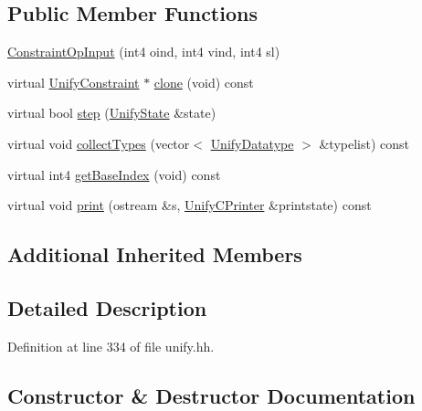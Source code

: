 \subsection*{Public Member Functions}
\begin{DoxyCompactItemize}
\item 
\mbox{\hyperlink{class_constraint_op_input_ab30df7a8432baa0c79c7e909c198ef65}{Constraint\+Op\+Input}} (int4 oind, int4 vind, int4 sl)
\item 
virtual \mbox{\hyperlink{class_unify_constraint}{Unify\+Constraint}} $\ast$ \mbox{\hyperlink{class_constraint_op_input_a59e0a95fa29163053aaf79e29697fd3c}{clone}} (void) const
\item 
virtual bool \mbox{\hyperlink{class_constraint_op_input_ad3db5bd9dd80ffb0492f0ffd11acd19c}{step}} (\mbox{\hyperlink{class_unify_state}{Unify\+State}} \&state)
\item 
virtual void \mbox{\hyperlink{class_constraint_op_input_a0f9b4168eddd0b1933a275bb1f67d7e1}{collect\+Types}} (vector$<$ \mbox{\hyperlink{class_unify_datatype}{Unify\+Datatype}} $>$ \&typelist) const
\item 
virtual int4 \mbox{\hyperlink{class_constraint_op_input_a78092a6de093b9f0843eab77043fe5be}{get\+Base\+Index}} (void) const
\item 
virtual void \mbox{\hyperlink{class_constraint_op_input_af29ea53a74e235c88e2aacea3e49b185}{print}} (ostream \&s, \mbox{\hyperlink{class_unify_c_printer}{Unify\+C\+Printer}} \&printstate) const
\end{DoxyCompactItemize}
\subsection*{Additional Inherited Members}


\subsection{Detailed Description}


Definition at line 334 of file unify.\+hh.



\subsection{Constructor \& Destructor Documentation}
\mbox{\label{class_constraint_op_input_ab30df7a8432baa0c79c7e909c198ef65}} 
